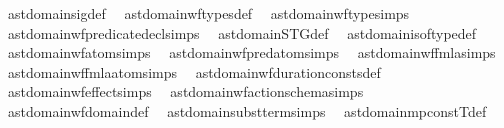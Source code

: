 \begin{isabellebody}
\ \ ast{\isacharunderscore}{\kern0pt}domain{\isachardot}{\kern0pt}sig{\isacharunderscore}{\kern0pt}def\isanewline
\ \ ast{\isacharunderscore}{\kern0pt}domain{\isachardot}{\kern0pt}wf{\isacharunderscore}{\kern0pt}types{\isacharunderscore}{\kern0pt}def\isanewline
\ \ ast{\isacharunderscore}{\kern0pt}domain{\isachardot}{\kern0pt}wf{\isacharunderscore}{\kern0pt}type{\isachardot}{\kern0pt}simps\isanewline
\ \ ast{\isacharunderscore}{\kern0pt}domain{\isachardot}{\kern0pt}wf{\isacharunderscore}{\kern0pt}predicate{\isacharunderscore}{\kern0pt}decl{\isachardot}{\kern0pt}simps\isanewline
\ \ ast{\isacharunderscore}{\kern0pt}domain{\isachardot}{\kern0pt}STG{\isacharunderscore}{\kern0pt}def\isanewline
\ \ ast{\isacharunderscore}{\kern0pt}domain{\isachardot}{\kern0pt}is{\isacharunderscore}{\kern0pt}of{\isacharunderscore}{\kern0pt}type{\isacharprime}{\kern0pt}{\isacharunderscore}{\kern0pt}def\isanewline
\ \ ast{\isacharunderscore}{\kern0pt}domain{\isachardot}{\kern0pt}wf{\isacharunderscore}{\kern0pt}atom{\isacharprime}{\kern0pt}{\isachardot}{\kern0pt}simps\isanewline
\ \ ast{\isacharunderscore}{\kern0pt}domain{\isachardot}{\kern0pt}wf{\isacharunderscore}{\kern0pt}pred{\isacharunderscore}{\kern0pt}atom{\isacharprime}{\kern0pt}{\isachardot}{\kern0pt}simps\isanewline
\ \ ast{\isacharunderscore}{\kern0pt}domain{\isachardot}{\kern0pt}wf{\isacharunderscore}{\kern0pt}fmla{\isacharprime}{\kern0pt}{\isachardot}{\kern0pt}simps\isanewline
\ \ ast{\isacharunderscore}{\kern0pt}domain{\isachardot}{\kern0pt}wf{\isacharunderscore}{\kern0pt}fmla{\isacharunderscore}{\kern0pt}atom{}{\isacharprime}{\kern0pt}{\isachardot}{\kern0pt}simps\isanewline
\ \ ast{\isacharunderscore}{\kern0pt}domain{\isachardot}{\kern0pt}wf{\isacharunderscore}{\kern0pt}duration{\isacharunderscore}{\kern0pt}consts{\isacharprime}{\kern0pt}{\isacharunderscore}{\kern0pt}def\isanewline
\ \ ast{\isacharunderscore}{\kern0pt}domain{\isachardot}{\kern0pt}wf{\isacharunderscore}{\kern0pt}effect{\isacharprime}{\kern0pt}{\isachardot}{\kern0pt}simps\isanewline
\ \ ast{\isacharunderscore}{\kern0pt}domain{\isachardot}{\kern0pt}wf{\isacharunderscore}{\kern0pt}action{\isacharunderscore}{\kern0pt}schema{\isacharprime}{\kern0pt}{\isachardot}{\kern0pt}simps\isanewline
\ \ ast{\isacharunderscore}{\kern0pt}domain{\isachardot}{\kern0pt}wf{\isacharunderscore}{\kern0pt}domain{\isacharprime}{\kern0pt}{\isacharunderscore}{\kern0pt}def\isanewline
\ \ ast{\isacharunderscore}{\kern0pt}domain{\isachardot}{\kern0pt}subst{\isacharunderscore}{\kern0pt}term{\isachardot}{\kern0pt}simps\isanewline
\ \ ast{\isacharunderscore}{\kern0pt}domain{\isachardot}{\kern0pt}mp{\isacharunderscore}{\kern0pt}constT{\isacharunderscore}{\kern0pt}def\isanewline

\end{isabellebody}
